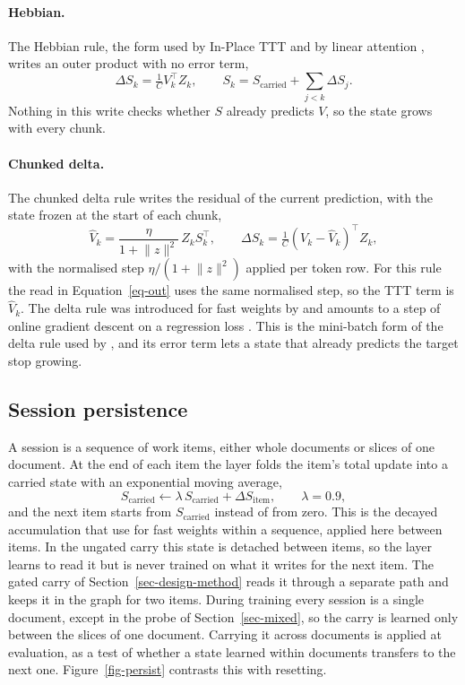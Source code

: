 \documentclass[12pt,a4paper]{report}
\begin{document}
\paragraph{Hebbian.} The Hebbian rule, the form used by In-Place TTT and by linear attention \citep{feng2026inplace,katharopoulos2020transformers}, writes an outer product with no error term,
\begin{equation}
  \Delta S_k = \tfrac{1}{C} V_k^\top Z_k, \qquad S_k = S_{\mathrm{carried}} + \textstyle\sum_{j<k} \Delta S_j .
\end{equation}
Nothing in this write checks whether $S$ already predicts $V$, so the state grows with every chunk.

\paragraph{Chunked delta.} The chunked delta rule writes the residual of the current prediction, with the state frozen at the start of each chunk,
\begin{equation}
  \hat V_k = \frac{\eta}{1 + \lVert z \rVert^2}\, Z_k S_k^\top, \qquad \Delta S_k = \tfrac{1}{C} (V_k - \hat V_k)^\top Z_k ,
\end{equation}
with the normalised step $\eta / (1 + \lVert z \rVert^2)$ applied per token row. For this rule the read in Equation~\ref{eq-out} uses the same normalised step, so the TTT term is $\hat V_k$. The delta rule was introduced for fast weights by \citet{schlag2021linear} and amounts to a step of online gradient descent on a regression loss \citep{yang2024deltanet}. This is the mini-batch form of the delta rule used by \citet{sun2025learning}, and its error term lets a state that already predicts the target stop growing.

\subsection{Session persistence}

A session is a sequence of work items, either whole documents or slices of one document. At the end of each item the layer folds the item's total update into a carried state with an exponential moving average,
\begin{equation}
  S_{\mathrm{carried}} \leftarrow \lambda\, S_{\mathrm{carried}} + \Delta S_{\mathrm{item}}, \qquad \lambda = 0.9 ,
\end{equation}
and the next item starts from $S_{\mathrm{carried}}$ instead of from zero. This is the decayed accumulation that \citet{ba2016using} use for fast weights within a sequence, applied here between items. In the ungated carry this state is detached between items, so the layer learns to read it but is never trained on what it writes for the next item. The gated carry of Section~\ref{sec-design-method} reads it through a separate path and keeps it in the graph for two items. During training every session is a single document, except in the probe of Section~\ref{sec-mixed}, so the carry is learned only between the slices of one document. Carrying it across documents is applied at evaluation, as a test of whether a state learned within documents transfers to the next one. Figure~\ref{fig-persist} contrasts this with resetting.
\end{document}

